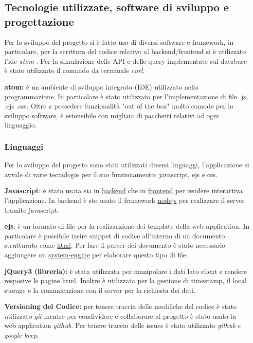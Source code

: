\documentclass[onecolumn,a4paper]{article}
\begin{document}
\subsection{Tecnologie utilizzate, software di sviluppo e progettazione}
\label{sec:orgbb310e0}
Per lo sviluppo del progetto si è fatto uso di diversi software e framework, in particolare, per la scrittura del codice relativo al backend/frontend si è utilizzato l'ide \emph{atom} . Per la simulazione delle API e delle query implementate sul database è stato utilizzato il comando da terminale \emph{curl}.

\textbf{atom:} è un ambiente di sviluppo integrato (IDE) utilizzato nella programmazione. In particolare è stato utilizzato per l'implementazione di file .js, .ejs .css. Oltre a possedere funzionalità "out of the box" molto comode per lo sviluppo software, è estensibile con migliaia di pacchetti relativi ad ogni linguaggio.

\subsubsection{Linguaggi}
\label{sec:org0454d22}
Per lo sviluppo del progetto sono stati utilizzati diversi linguaggi, l’applicazione si avvale di varie tecnologie per il suo funzionamento: javascript, ejs e css.

\textbf{Javascript}: è stato usata sia in \uline{backend} che in \uline{frontend} per rendere interattiva l'applicazione. In backend è sto usato il framework \uline{nodejs} per realizzare il server tramite javascript.

\textbf{ejs}: è un formato di file per la realizzazione dei template della web application. In particolare è possibile insire snippet di codice all'interno di un documento strutturato come \uline{html}. Per fare il parser dei documento è stato necessario aggiungere un \uline{system-engine} per elaborare questo tipo di file.

\textbf{jQuery3 (libreria):} è stata utilizzata per manipolare i dati lato client e rendere resposive le pagine html. Inoltre è utilizzata per la gestione di timestamp, il local storage e la comunicazione con il server per la richiesta dei dati.

\textbf{Versioning del Codice:} per tenere traccia delle modifiche del codice è stato utilizzato \emph{git} mentre per condividere e collaborare al progetto è stato usata la web application \emph{github}. Per tenere traccio delle issues è stato utilizzato \emph{github} e \emph{google-keep}.   
\end{document}
